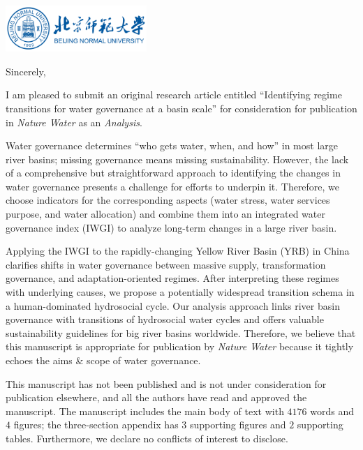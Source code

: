 \documentclass[11pt,a4paper,roman]{moderncv}
\begin{document}
\begin{minipage}[t]{\textwidth}
\includegraphics[width=0.40\textwidth]{bnu}
\end{minipage}


\opening{\vspace*{-2em}}
\closing{Sincerely,}{\vspace*{-2em}}
\makelettertitle

I am pleased to submit an original research article entitled ``Identifying regime transitions for water governance at a basin scale'' for consideration for publication in \textit{Nature Water} as an \textit{Analysis}.

Water governance determines ``who gets water, when, and how'' in most large river basins; missing governance means missing sustainability. However, the lack of a comprehensive but straightforward approach to identifying the changes in water governance presents a challenge for efforts to underpin it. Therefore, we choose indicators for the corresponding aspects (water stress, water services purpose, and water allocation) and combine them into an integrated water governance index (IWGI) to analyze long-term changes in a large river basin.

Applying the IWGI to the rapidly-changing Yellow River Basin (YRB) in China clarifies shifts in water governance between massive supply, transformation governance, and adaptation-oriented regimes. After interpreting these regimes with underlying causes, we propose a potentially widespread transition schema in a human-dominated hydrosocial cycle. Our analysis approach links river basin governance with transitions of hydrosocial water cycles and offers valuable sustainability guidelines for big river basins worldwide. Therefore, we believe that this manuscript is appropriate for publication by \textit{Nature Water} because it tightly echoes the aims \& scope of water governance.

This manuscript has not been published and is not under consideration for publication elsewhere, and all the authors have read and approved the manuscript. The manuscript includes the main body of text with $4176$ words and $4$ figures; the three-section appendix has $3$ supporting figures and $2$ supporting tables. Furthermore, we declare no conflicts of interest to disclose.
\end{document}
